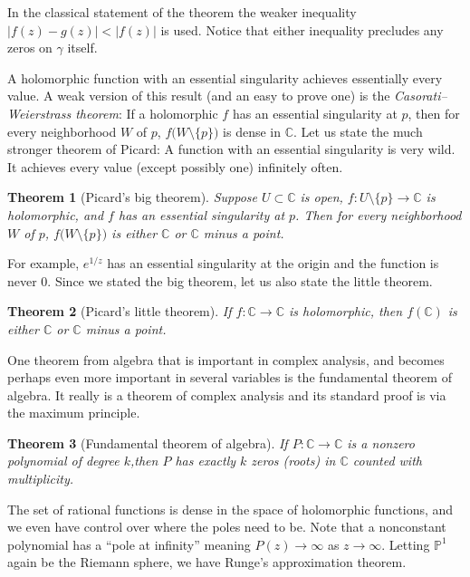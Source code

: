 \documentclass[12pt,openany]{book}
\newcommand{\sabs}[1]{\lvert {#1} \rvert}
\newcommand{\C}{{\mathbb{C}}}
\newcommand{\bP}{{\mathbb{P}}}
\newcommand{\myindex}[1]{#1\index{#1}}
\theoremstyle{plain}
\newtheorem{thm}{Theorem}[section]
\theoremstyle{remark}
\theoremstyle{definition}
\theoremstyle{exercise}
\theoremstyle{example}
\begin{document}
In the classical statement of the theorem the weaker
inequality $\sabs{f(z)-g(z)} < \sabs{f(z)}$ is used.
Notice that either inequality precludes any zeros on $\gamma$ itself.

A holomorphic function with an essential singularity achieves essentially
every value.  A weak version of this result (and an easy to prove one)
is the \emph{\myindex{Casorati--Weierstrass theorem}}:
If a holomorphic $f$ has an essential singularity at $p$,
then for every neighborhood $W$ of $p$, $f\bigl(W \setminus \{p\}\bigr)$ is dense in
$\C$.  Let us state the much stronger theorem of Picard:
A function with an essential singularity is very wild.
It achieves every value (except possibly one) infinitely often.

\begin{thm}[Picard's big theorem]
Suppose $U \subset \C$ is open, $f \colon U \setminus \{ p \} \to \C$
is holomorphic, and $f$ has an essential singularity at $p$.  Then for every
neighborhood $W$ of $p$, $f\bigl(W \setminus \{ p \}\bigr)$ is either $\C$
or $\C$ minus a point.
\end{thm}

For example, $e^{1/z}$ has an essential singularity at the origin
and the function is never 0.
Since we stated the big theorem, let us also state the little theorem.

\begin{thm}[Picard's little theorem]
If $f \colon \C \to \C$ is holomorphic,
then
$f(\C)$ is either $\C$ or $\C$ minus a point.
\end{thm}


One theorem from algebra that is important in complex analysis, and becomes
perhaps even more important in several variables is the fundamental theorem
of algebra.  It really is a theorem of complex analysis and its standard
proof is via the maximum principle.

\begin{thm}[Fundamental theorem of algebra]
\label{thm:fundamentalthmalg}%
If $P \colon \C \to \C$ is a nonzero polynomial of degree $k$,\linebreak[2]
then $P$
has exactly $k$ zeros (roots) in $\C$ counted with multiplicity.
\end{thm}

The set of rational functions is dense in the space of holomorphic
functions, and we even have control over where the poles need to be.
Note that a nonconstant polynomial has a ``pole at infinity'' meaning
$P(z) \to \infty$ as $z \to \infty$.  Letting $\bP^1$ again be the Riemann
sphere, we have Runge's approximation theorem.
\end{document}
